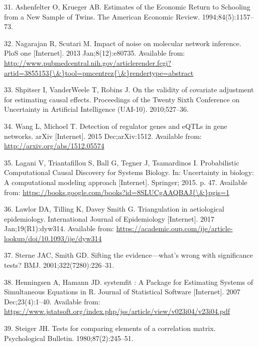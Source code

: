 \documentclass[]{article}
\begin{document}
\hypertarget{ref-Ashenfelter1994}{}
31. Ashenfelter O, Krueger AB. Estimates of the Economic Return to
Schooling from a New Sample of Twins. The American Economic Review.
1994;84(5):1157--73.

\hypertarget{ref-Nagarajan2013}{}
32. Nagarajan R, Scutari M. Impact of noise on molecular network
inference. PloS one {[}Internet{]}. 2013 Jan;8(12):e80735. Available
from:
\href{http://www.pubmedcentral.nih.gov/articlerender.fcgi?artid=3855153\%7B/\&\%7Dtool=pmcentrez\%7B/\&\%7Drendertype=abstract}{http://www.pubmedcentral.nih.gov/articlerender.fcgi?artid=3855153\{\textbackslash{}\&\}tool=pmcentrez\{\textbackslash{}\&\}rendertype=abstract}

\hypertarget{ref-Shpitser2010}{}
33. Shpitser I, VanderWeele T, Robins J. On the validity of covariate
adjustment for estimating causal effects. Proceedings of the Twenty
Sixth Conference on Uncertainty in Artificial Intelligence (UAI-10).
2010;527--36.

\hypertarget{ref-Wang2015}{}
34. Wang L, Michoel T. Detection of regulator genes and eQTLs in gene
networks. arXiv {[}Internet{]}. 2015 Dec;arXiv:1512. Available from:
\url{http://arxiv.org/abs/1512.05574}

\hypertarget{ref-Lagani2015}{}
35. Lagani V, Triantafillou S, Ball G, Tegner J, Tsamardinos I.
Probabilistic Computational Causal Discovery for Systems Biology. In:
Uncertainty in biology: A computational modeling approach
{[}Internet{]}. Springer; 2015. p. 47. Available from:
\href{https://books.google.com/books?id=8SLUCgAAQBAJ\%7B/\&\%7Dpgis=1}{https://books.google.com/books?id=8SLUCgAAQBAJ\{\textbackslash{}\&\}pgis=1}

\hypertarget{ref-Lawlor2017}{}
36. Lawlor DA, Tilling K, Davey Smith G. Triangulation in aetiological
epidemiology. International Journal of Epidemiology {[}Internet{]}. 2017
Jan;19(R1):dyw314. Available from:
\url{https://academic.oup.com/ije/article-lookup/doi/10.1093/ije/dyw314}

\hypertarget{ref-Sterne2001}{}
37. Sterne JAC, Smith GD. Sifting the evidence---what's wrong with
significance tests? BMJ. 2001;322(7280):226--31.

\hypertarget{ref-Henningsen2007}{}
38. Henningsen A, Hamann JD. systemfit : A Package for Estimating
Systems of Simultaneous Equations in R. Journal of Statistical Software
{[}Internet{]}. 2007 Dec;23(4):1--40. Available from:
\url{https://www.jstatsoft.org/index.php/jss/article/view/v023i04/v23i04.pdf}

\hypertarget{ref-Steiger1980}{}
39. Steiger JH. Tests for comparing elements of a correlation matrix.
Psychological Bulletin. 1980;87(2):245--51.
\end{document}
